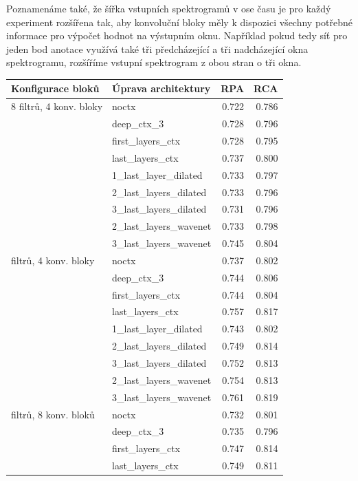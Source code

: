 Poznamenáme také, že šířka vstupních spektrogramů v ose času je pro každý experiment rozšířena tak, aby konvoluční bloky měly k dispozici všechny potřebné informace pro výpočet hodnot na výstupním oknu. Například pokud tedy síť pro jeden bod anotace využívá také tři předcházející a tři nadcházející okna spektrogramu, rozšíříme vstupní spektrogram z obou stran o tři okna.

\begin{table}[h]
\centering
\begin{tabular}{llrr}

\toprule
Konfigurace bloků & Úprava architektury &   RPA &   RCA \\
\midrule
8 filtrů, 4 konv. bloky & noctx & 0.722 & 0.786 \\
{} & deep\_ctx\_3 & 0.728 & 0.796 \\
{} & first\_layers\_ctx & 0.728 & 0.795 \\
{} & last\_layers\_ctx & 0.737 & 0.800 \\
{} & 1\_last\_layer\_dilated & 0.733 & 0.797 \\
{} & 2\_last\_layers\_dilated & 0.733 & 0.796 \\
{} & 3\_last\_layers\_dilated & 0.731 & 0.796 \\
{} & 2\_last\_layers\_wavenet & 0.733 & 0.798 \\
{} & 3\_last\_layers\_wavenet & 0.745 & 0.804 \\
\arrayrulecolor{black!30}\midrule
16 filtrů, 4 konv. bloky & noctx & 0.737 & 0.802 \\
{} & deep\_ctx\_3 & 0.744 & 0.806 \\
{} & first\_layers\_ctx & 0.744 & 0.804 \\
{} & last\_layers\_ctx & 0.757 & 0.817 \\
{} & 1\_last\_layer\_dilated & 0.743 & 0.802 \\
{} & 2\_last\_layers\_dilated & 0.749 & 0.814 \\
{} & 3\_last\_layers\_dilated & 0.752 & 0.813 \\
{} & 2\_last\_layers\_wavenet & 0.754 & 0.813 \\
{} & 3\_last\_layers\_wavenet & 0.761 & 0.819 \\
\arrayrulecolor{black!30}\midrule
8 filtrů, 8 konv. bloků & noctx & 0.732 & 0.801 \\
{} & deep\_ctx\_3 & 0.735 & 0.796 \\
{} & first\_layers\_ctx & 0.747 & 0.814 \\
{} & last\_layers\_ctx & 0.749 & 0.811 \\

\end{tabular}
\end{table}
